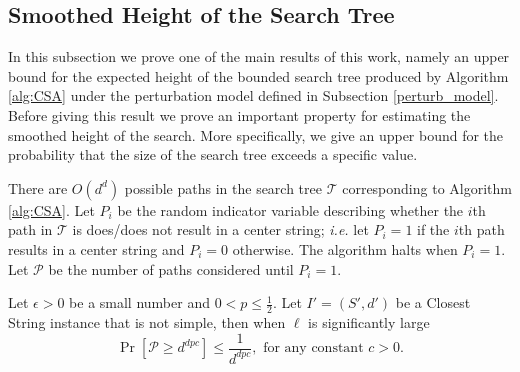 \subsection{Smoothed Height of the Search Tree}

In this subsection we prove one of the main results of this work, namely an upper bound for the expected height of the bounded search tree produced by Algorithm \ref{alg:CSA} under the perturbation model defined in Subsection \ref{perturb_model}.  Before giving this result we prove an important property for estimating the smoothed height of the search. More specifically, we give an upper bound for the probability that the size of the search tree exceeds a specific value.

There are $O(d^d)$ possible paths in the search tree $\mathcal{T}$ corresponding to Algorithm \ref{alg:CSA}.  Let $P_i$ be the random indicator variable describing whether the $i$th path in $\mathcal{T}$ is does/does not result in a center string; {\em i.e. } let $P_i = 1$ if the $i$th path results in a center string and $P_i = 0$ otherwise.  The algorithm halts when $P_i = 1$. Let $\mathcal{P}$ be the number of paths considered until $P_i = 1$.  

\begin{lemma} \label{lem:bound} Let $\epsilon >0$ be a small number and $0 < p \leq \frac{1}{2}$.  Let $I' = (S', d')$ be a {\sc Closest String} instance that is not simple, then when $\ell$ is significantly large $$\Pr[ \mathcal{P} \geq d^{dpc}]\leq \frac{1}{d^{dpc}}, \, \, \mbox{for any constant $c > 0$}.$$ \end{lemma}

